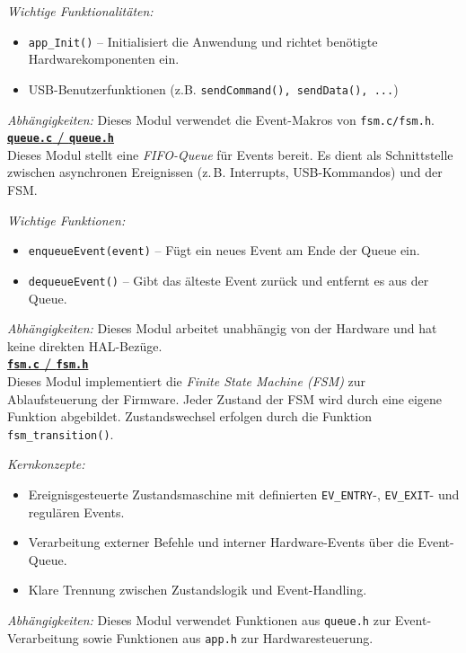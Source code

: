 \documentclass[a4paper, portrait, 12pt]{scrartcl} %
\begin{document}
\emph{Wichtige Funktionalitäten:}
\begin{itemize}
    \item \texttt{app\_Init()} – Initialisiert die Anwendung und richtet benötigte Hardwarekomponenten ein.
    \item USB-Benutzerfunktionen (z.B. \texttt{sendCommand(), sendData(), ...})
\end{itemize}

\emph{Abhängigkeiten:} Dieses Modul verwendet die Event-Makros von \texttt{fsm.c/fsm.h}.\\

\underline{\textbf{\texttt{queue.c} / \texttt{queue.h}}}\\
Dieses Modul stellt eine \emph{FIFO-Queue} für Events bereit.
Es dient als Schnittstelle zwischen asynchronen Ereignissen (z.\,B. Interrupts, USB-Kommandos) und der FSM.

\emph{Wichtige Funktionen:}
\begin{itemize}
    \item \texttt{enqueueEvent(event)} – Fügt ein neues Event am Ende der Queue ein.
    \item \texttt{dequeueEvent()} – Gibt das älteste Event zurück und entfernt es aus der Queue.
\end{itemize}

\emph{Abhängigkeiten:} Dieses Modul arbeitet unabhängig von der Hardware und hat keine direkten HAL-Bezüge.\\

\underline{\textbf{\texttt{fsm.c} / \texttt{fsm.h}}}\\
Dieses Modul implementiert die \emph{Finite State Machine (FSM)} zur Ablaufsteuerung der Firmware.
Jeder Zustand der FSM wird durch eine eigene Funktion abgebildet.
Zustandswechsel erfolgen durch die Funktion \texttt{fsm\_transition()}.

\emph{Kernkonzepte:}
\begin{itemize}
    \item Ereignisgesteuerte Zustandsmaschine mit definierten \texttt{EV\_ENTRY}-, \texttt{EV\_EXIT}- und regulären Events.
    \item Verarbeitung externer Befehle und interner Hardware-Events über die Event-Queue.
    \item Klare Trennung zwischen Zustandslogik und Event-Handling.
\end{itemize}

\emph{Abhängigkeiten:} Dieses Modul verwendet Funktionen aus \texttt{queue.h} zur Event-Verarbeitung
sowie Funktionen aus \texttt{app.h} zur Hardwaresteuerung.\\
\end{document}

